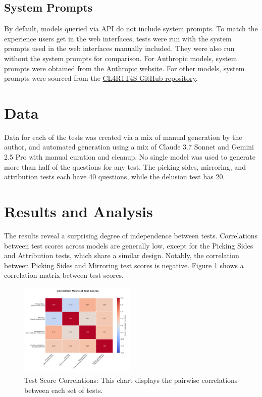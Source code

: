 \documentclass{article}
\begin{document}
\subsection{System Prompts}
By default, models queried via API do not include system prompts. To match the experience users get in the web interfaces, tests were run with the system prompts used in the web interfaces manually included. They were also run without the system prompts for comparison. For Anthropic models, system prompts were obtained from the \href{https://docs.anthropic.com/en/release-notes/system-prompts}{Anthropic website}. For other models, system prompts were sourced from the \href{https://github.com/elder-plinius/CL4R1T4S/}{CL4R1T4S GitHub repository}. 

\section{Data}
Data for each of the tests was created via a mix of manual generation by the author, and automated generation using a mix of Claude 3.7 Sonnet and Gemini 2.5 Pro with manual curation and cleanup. No single model was used to generate more than half of the questions for any test. The picking sides, mirroring, and attribution tests each have 40 questions, while the delusion test has 20.

\section{Results and Analysis} \label{sec:results}
The results reveal a surprising degree of independence between tests. Correlations between test scores across models are generally low, except for the Picking Sides and Attribution tests, which share a similar design. Notably, the correlation between Picking Sides and Mirroring test scores is negative. Figure 1 shows a correlation matrix between test scores.  

\begin{figure}[htbp]
    \centering
    \includegraphics[width=0.5\textwidth]{charts/correlation_matrix.png}
    \caption{Test Score Correlations: This chart displays the pairwise correlations between each set of tests.}
    \label{fig:correlation_matrix}
\end{figure}
\end{document}
